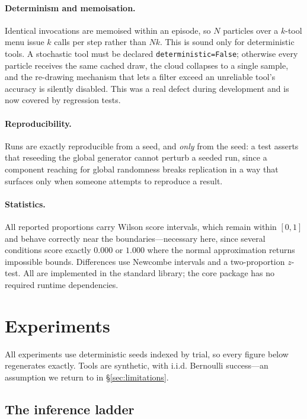 \documentclass[11pt,a4paper]{article}
\begin{document}
\paragraph{Determinism and memoisation.}
Identical invocations are memoised within an episode, so $N$ particles over a
$k$-tool menu issue $k$ calls per step rather than $N k$. This is sound only
for deterministic tools. A stochastic tool must be declared
\texttt{deterministic=False}; otherwise every particle receives the same cached
draw, the cloud collapses to a single sample, and the re-drawing mechanism that
lets a filter exceed an unreliable tool's accuracy is silently disabled. This
was a real defect during development and is now covered by regression tests.

\paragraph{Reproducibility.}
Runs are exactly reproducible from a seed, and \emph{only} from the seed: a
test asserts that reseeding the global generator cannot perturb a seeded run,
since a component reaching for global randomness breaks replication in a way
that surfaces only when someone attempts to reproduce a result.

\paragraph{Statistics.}
All reported proportions carry Wilson score intervals, which remain within
$[0,1]$ and behave correctly near the boundaries---necessary here, since
several conditions score exactly $0.000$ or $1.000$ where the normal
approximation returns impossible bounds. Differences use Newcombe intervals and
a two-proportion $z$-test. All are implemented in the standard library; the
core package has no required runtime dependencies.

\section{Experiments}
\label{sec:experiments}

All experiments use deterministic seeds indexed by trial, so every figure below
regenerates exactly. Tools are synthetic, with i.i.d. Bernoulli success---an
assumption we return to in \S\ref{sec:limitations}.

\subsection{The inference ladder}
\label{sec:exp-ladder}
\end{document}
